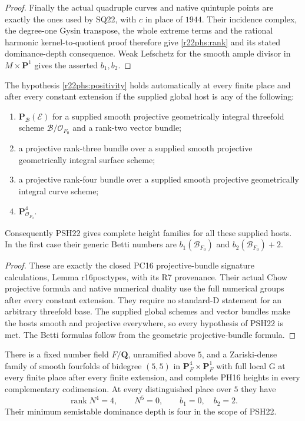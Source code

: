 \begin{proof}
Finally the actual quadruple
curves and native quintuple
points are exactly the ones
used by SQ22, with $c$ in
place of $1944$.  Their
incidence complex, the
degree-one Gysin transpose,
the whole extreme terms and
the rational harmonic
kernel-to-quotient proof
therefore give
\eqref{r22phs:rank} and its
stated dominance-depth
consequence.  Weak Lefschetz
for the smooth ample divisor
in $M\times\mathbf P^1$
gives the asserted $b_1,b_2$.
\end{proof}

\begin{corollary}
\label{r22phs:bundles}
The hypothesis \eqref{r22phs:positivity}
holds automatically at every finite
place and after every constant
extension if the supplied global
host is any of the following:
\begin{enumerate}
\item $\mathbf P_{\mathcal B}(\mathcal E)$
for a supplied smooth projective
geometrically integral threefold
scheme $\mathcal B/\mathcal O_{F_0}$
and a rank-two vector bundle;
\item a projective rank-three
bundle over a supplied smooth
projective geometrically integral
surface scheme;
\item a projective rank-four
bundle over a supplied smooth
projective geometrically integral
curve scheme;
\item $\mathbf P^4_{\mathcal O_{F_0}}$.
\end{enumerate}
Consequently PSH22 gives complete
height families for all these
supplied hosts.  In the first
case their generic Betti numbers
are $b_1(\mathcal B_{F_0})$ and
$b_2(\mathcal B_{F_0})+2$.
\end{corollary}

\begin{proof}
These are exactly the closed
PC16 projective-bundle signature
calculations, Lemma
\textup{r16pos:types}, with its
R7 provenance.  Their actual
Chow projective formula and
native numerical duality use
the full numerical groups
after every constant extension.
They require no standard-D
statement for an arbitrary
threefold base.  The supplied
global schemes and vector
bundles make the hosts smooth
and projective everywhere, so
every hypothesis of PSH22 is
met.  The Betti formulas
follow from the geometric
projective-bundle formula.
\end{proof}

\begin{corollary}
\label{r22phs:P4}
There is a fixed number field
$F/\mathbf Q$, unramified above
$5$, and a Zariski-dense family
of smooth fourfolds of bidegree
$(5,5)$ in
$\mathbf P^4_F\times\mathbf P^1_F$
with full local G at every
finite place after every
finite extension, and complete
PH16 heights in every
complementary codimension.
At every distinguished place
over $5$ they have
\[
              \operatorname{rank}N^4=4,\qquad
              N^5=0,\qquad b_1=0,\quad b_2=2.
 \tag{PSH22.6}\label{r22phs:P4invariants}
\]
Their minimum semistable
dominance depth is four in
the scope of PSH22.
\end{corollary}

